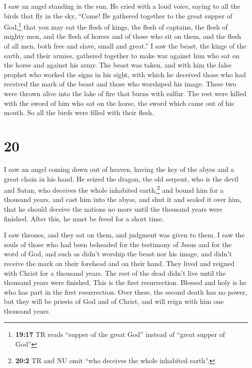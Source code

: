  I saw an angel standing in the sun. He cried with a loud
voice, saying to all the birds that fly in the sky, ``Come! Be gathered
together to the great supper of God,\footnote{\textbf{19:17} TR reads
  ``supper of the great God'' instead of ``great supper of God''}
 that you may eat the flesh of kings, the flesh of
captains, the flesh of mighty men, and the flesh of horses and of those
who sit on them, and the flesh of all men, both free and slave, small
and great.''  I saw the beast, the kings of the earth,
and their armies, gathered together to make war against him who sat on
the horse and against his army.  The beast was taken, and
with him the false prophet who worked the signs in his sight, with which
he deceived those who had received the mark of the beast and those who
worshiped his image. These two were thrown alive into the lake of fire
that burns with sulfur.  The rest were killed with the
sword of him who sat on the horse, the sword which came out of his
mouth. So all the birds were filled with their flesh.

\hypertarget{section-19}{%
\section{20}\label{section-19}}

 I saw an angel coming down out of heaven, having the key
of the abyss and a great chain in his hand.  He seized the
dragon, the old serpent, who is the devil and Satan, who deceives the
whole inhabited earth,\footnote{\textbf{20:2} TR and NU omit ``who
  deceives the whole inhabited earth''.} and bound him for a thousand
years,  and cast him into the abyss, and shut it and
sealed it over him, that he should deceive the nations no more until the
thousand years were finished. After this, he must be freed for a short
time.

 I saw thrones, and they sat on them, and judgment was
given to them. I saw the souls of those who had been beheaded for the
testimony of Jesus and for the word of God, and such as didn't worship
the beast nor his image, and didn't receive the mark on their forehead
and on their hand. They lived and reigned with Christ for a thousand
years.  The rest of the dead didn't live until the
thousand years were finished. This is the first resurrection.
 Blessed and holy is he who has part in the first
resurrection. Over these, the second death has no power, but they will
be priests of God and of Christ, and will reign with him one thousand
years.

